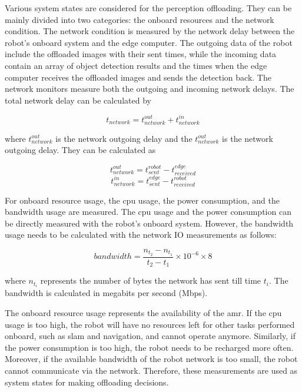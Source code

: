 Various system states are considered for the perception offloading. They can be mainly divided into two categories: the onboard resources and the network condition. The network condition is measured by the network delay between the robot's onboard system and the edge computer. The outgoing data of the robot include the offloaded images with their sent times, while the incoming data contain an array of object detection results and the times when the edge computer receives the offloaded images and sends the detection back. The network monitors measure both the outgoing and incoming network delays. The total network delay can be calculated by

\begin{equation}
    t_{network} = t_{network}^{out} + t_{network}^{in}
\end{equation}

where $t_{network}^{out}$ is the network outgoing delay and the $t_{network}^{out}$ is the network outgoing delay. They can be calculated as

\begin{equation*}
    t_{network}^{out} = t_{sent}^{robot} - t_{received}^{edge}
\end{equation*}
\begin{equation*}
    t_{network}^{in} = t_{sent}^{edge} - t_{received}^{robot}
\end{equation*}

For onboard resource usage, the \gls{cpu} usage, the power consumption, and the bandwidth usage are measured. The \gls{cpu} usage and the power consumption can be directly measured with the robot's onboard system. However, the bandwidth usage needs to be calculated with the network IO measurements as follows:

\begin{equation}\label{eqn:bandwidth}
    bandwidth = \frac{n_{t_2} - n_{t_1}}{t_2 - t_1} \times 10^{-6} \times 8
\end{equation}

where $n_{t_i}$ represents the number of bytes the network has sent till time $t_i$. The bandwidth is calculated in megabits per second (Mbps). 

The onboard resource usage represents the availability of the \gls{amr}. If the \gls{cpu} usage is too high, the robot will have no resources left for other tasks performed onboard, such as \gls{slam} and navigation, and cannot operate anymore. Similarly, if the power consumption is too high, the robot needs to be recharged more often. Moreover, if the available bandwidth of the robot network is too small, the robot cannot communicate via the network. Therefore, these measurements are used as system states for making offloading decisions. 


